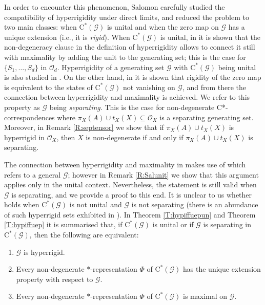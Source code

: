 \documentclass[11pt, draft]{amsart}
\numberwithin{equation}{section}
\theoremstyle{plain}
\theoremstyle{definition}
\theoremstyle{remark}
\newcommand{\G}{{\mathcal{G}}}
\renewcommand{\O}{{\mathcal{O}}}
\newcommand{\ca}{\mathrm{C}^*}
\begin{document}
In order to encounter this phenomenon, Salomon \cite{Sal17} carefully studied the compatibility of hyperrigidity under direct limits, and reduced the problem to two main classes: when $\ca(\G)$ is unital and when the zero map on $\G$ has a unique extension (i.e., it is \emph{rigid}).
When $\ca(\G)$ is unital, in \cite[Proposition 2.1]{Sal17} it is shown that the non-degeneracy clause in the definition of hyperrigidity allows to connect it still with maximality by adding the unit to the generating set; this is the case for $\{S_1, \dots, S_d\}$ in $\O_d$. 
Hyperrigidity of a generating set $\G$ with $\ca(\G)$ being unital is also studied in \cite{PS25}.
On the other hand, in \cite[Theorem 3.3]{Sal17} it is shown that rigidity of the zero map is equivalent to the states of $\ca(\G)$ not vanishing on $\G$, and from there the connection between hyperrigidity and maximality is achieved.
We refer to this property as $\G$ being \emph{separating}.
This is the case for non-degenerate C*-correspondences where $\pi_X(A) \cup t_X(X)\subseteq \O_X$ is a separating generating set. Moreover, in Remark \ref{R:septensor} we show that if $\pi_X(A) \cup t_X(X)$ is hyperrigid in $\O_X$, then $X$ is non-degenerate if and only if $\pi_X(A) \cup t_X(X)$ is separating.

The connection between hyperrigidity and maximality in \cite{Sal17} makes use of \cite[Lemma 2.7, item (ii)]{Sal17} which refers to a general $\G$; however in Remark \ref{R:Salunit} we show that this argument applies only in the unital context.
Nevertheless, the statement is still valid when $\G$ is separating, and we provide a proof to this end.
It is unclear to us whether \cite[Lemma 2.7, item (ii)]{Sal17} holds when $\ca(\G)$ is not unital and $\G$ is not separating (there is an abundance of such hyperrigid sets exhibited in \cite{Sal17}).
In Theorem \ref{T:hypiffuepun} and Theorem \ref{T:hypiffuep} it is summarised that, if $\ca(\G)$ is unital or if $\G$ is separating in $\ca(\G)$, then the following are equivalent:
\begin{enumerate}
\item $\G$ is hyperrigid.
\item Every non-degenerate $*$-representation $\Phi$ of $\ca(\G)$ has the unique extension property with respect to $\G$.
\item Every non-degenerate $*$-representation $\Phi$ of $\ca(\G)$ is maximal on $\G$.
\end{enumerate}
\end{document}
